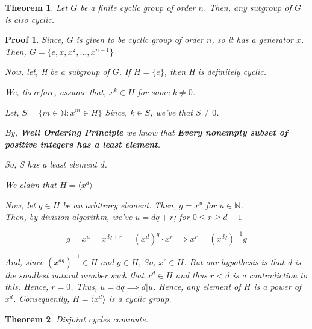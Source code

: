 \documentclass[12pt,a4paper]{article}
\theoremstyle{custom}
\newtheorem*{theorem}{Theorem}
\newtheorem*{proofcustom}{Proof}
\begin{document}
\begin{theorem}
    Let $G$ be a finite cyclic group of order $n$. Then, any subgroup of $G$ is also cyclic.
\end{theorem}
\begin{proofcustom}
    Since, $G$ is given to be cyclic group of order $n$, so it has a generator $x$.\\
Then, $\boxed{G=\{e,x, x^2, ..., x^{n-1}\}}$

Now, let, H be a subgroup of $G$. If $H=\{e\}$, then H is definitely cyclic.

We, therefore, assume that, $x^k \in H$ for some $k \neq 0$.

Let, $S=\{ m \in \mathbb{N} : x^m \in H\}$
Since, $k\in S$, we've that $S\neq 0$.

By, \textbf{Well Ordering Principle} we know that \textbf{Every nonempty subset of  positive integers has a least element}.



So, S has a least element $d$.

We claim that $H= \langle x^d \rangle$

Now, let $g\in H$ be an arbitrary element. Then, $g= x^u$ for $u \in \mathbb{N}$. \\

Then, by division algorithm, we've 
$u=dq+r$; for $0\leq r \geq d-1$

   $$\boxed{ g= x^u=x^{dq+r}= {(x^d)}^q \cdot x^r \implies x^r= {(x^{dq})}^{-1}g}$$

And, since ${(x^{dq})}^{-1} \in H$ and $g \in H$, So, $x^r \in H$.
But our hypothesis is that d is the smallest natural number such that $x^d \in H$ and thus $r <d$ is a contradiction to this. 
Hence, $r=0$.
Thus, $u=dq \implies d | u$. 
Hence, any element of $H$ is a power of $x^d$.
Consequently, $H= \langle x^d \rangle$ is a cyclic group. 
\end{proofcustom}
\begin{theorem}
    Disjoint cycles commute. 

\end{theorem}
\end{document}
